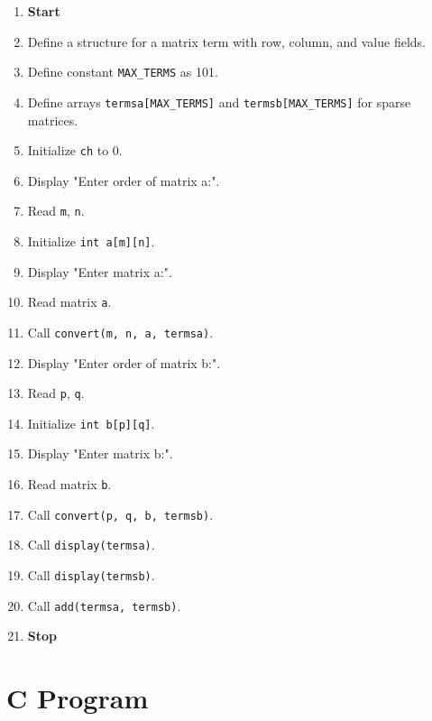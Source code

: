 \begin{enumerate}[label=\arabic*:,left=0pt]
  \item \textbf{Start}
  \item Define a structure for a matrix term with row, column, and value fields.
  \item Define constant \texttt{MAX\_TERMS} as 101.\
  \item Define arrays \texttt{termsa[MAX\_TERMS]} and \texttt{termsb[MAX\_TERMS]} for sparse matrices.
  \item Initialize \texttt{ch} to 0.
  \item Display "Enter order of matrix a:".
  \item Read \texttt{m}, \texttt{n}.
  \item Initialize \texttt{int a[m][n]}.
  \item Display "Enter matrix a:".
  \item Read matrix \texttt{a}.
  \item Call \texttt{convert(m, n, a, termsa)}.
  \item Display "Enter order of matrix b:".
  \item Read \texttt{p}, \texttt{q}.
  \item Initialize \texttt{int b[p][q]}.
  \item Display "Enter matrix b:".
  \item Read matrix \texttt{b}.
  \item Call \texttt{convert(p, q, b, termsb)}.
  \item Call \texttt{display(termsa)}.
  \item Call \texttt{display(termsb)}.
  \item Call \texttt{add(termsa, termsb)}.
  \item \textbf{Stop}
\end{enumerate}


\section{C Program}

